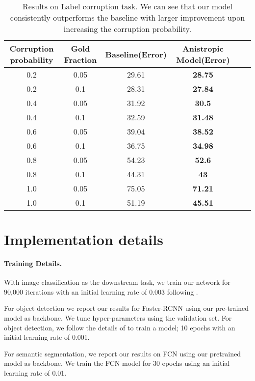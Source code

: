 \documentclass{bmvc2k}
\begin{document}
\begin{table*}[t!]
\begin{center}
\caption{Results on Label corruption task. We can see that our model consistently outperforms the baseline with larger improvement upon increasing the corruption probability.}
\begin{tabular}{cccccc}  
\toprule
Corruption probability    & Gold Fraction & Baseline(Error) & Anistropic Model(Error) \\
\midrule
0.2 &	0.05 &	29.61 &\textbf{	28.75 } \\
0.2 &	0.1 &	28.31 &	\textbf{27.84} \\
0.4 &	0.05 &	31.92 &	\textbf{30.5} \\
0.4 &	0.1 &	32.59 &	\textbf{31.48} \\
0.6 &	0.05 &	39.04 &	\textbf{38.52} \\
0.6 &	0.1 &	36.75 &	\textbf{34.98} \\
0.8 &	0.05 &	54.23 &	\textbf{52.6} \\
0.8 &	0.1 &	44.31 &	\textbf{43} \\
1.0 &	0.05 &	75.05 &	\textbf{71.21} \\
1.0 &	0.1 &	51.19 &	\textbf{45.51} \\
\bottomrule
\end{tabular}
\label{tab:Label_Corruption}
\end{center}
\end{table*}

\section{Implementation details}
\paragraph{Training Details.}
With image classification as the downstream task, we train our network for 90,000 iterations with an
initial learning rate of 0.003 following \cite{Caron2018DeepCF}. 

For object detection we report our
results for Faster-RCNN \cite{Ren2015FasterRT} using our pre-trained model as backbone. 
We tune hyper-parameters using the validation set.  
For object detection, we follow the details of \cite{Ren2015FasterRT} to train a model; 10 epochs with an initial learning rate of 0.001.

For semantic segmentation, we report our results on FCN\cite{Shelhamer_2017} using our pretrained model as backbone. 
We train the FCN model for 30 epochs using an initial learning rate of 0.01.
\end{document}
